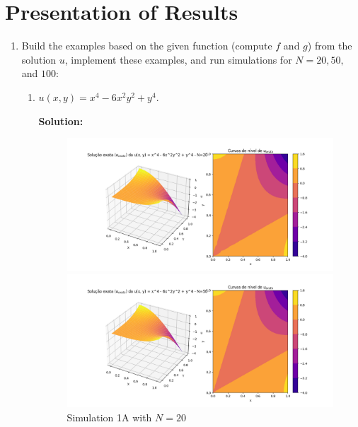 \documentclass[aps,amsmath,amssymb,floatfix]{revtex4}
\begin{document}
\section{Presentation of Results}
\begin{enumerate}
	\item Build the examples based on the given function (compute $f$ and $g$) from the solution $u$, implement these examples, and run simulations for $N = 20, 50,$ and $100$:
	      \begin{enumerate}
	      	\item $u(x,y) = x^4 - 6x^2y^2 + y^4$.
	      	      
	      	      \textbf{Solution:}
	      	      
	      	      \begin{figure}[H]
	      	      	\centering
	      	      	\begin{minipage}{0.32\textwidth}
	      	      		\centering
	      	      		\includegraphics[width=\textwidth]{img/Problem1/a_20.png}
	      	      		\caption{Simulation 1A with $N = 20$}
	      	      	\end{minipage}
	      	      	\hfill
	      	      	\begin{minipage}{0.32\textwidth}
	      	      		\centering
	      	      		\includegraphics[width=\textwidth]{img/Problem1/a_50.png}

\end{minipage}
\end{figure}
\end{enumerate}
\end{enumerate}
\end{document}
